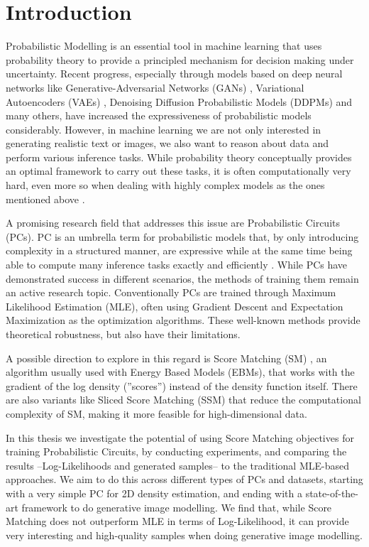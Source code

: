 \chapter{Introduction}
\label{cha:introduction}


Probabilistic Modelling is an essential tool in machine learning that uses probability theory to provide a 
principled mechanism for decision making under uncertainty. Recent progress, especially through models based on deep neural networks like Generative-Adversarial
Networks (GANs) \cite{gan}, Variational Autoencoders (VAEs) \cite{vae}, Denoising Diffusion Probabilistic Models (DDPMs) \cite{ddpm} and many others, have increased the expressiveness of probabilistic models considerably. 
However, in machine learning we are not only interested in generating realistic text or images, 
we also want to reason about data and perform various inference tasks. While probability theory conceptually provides 
an optimal framework to carry out these tasks, it is often computationally very hard, even more so when dealing 
with highly complex models as the ones mentioned above \cite{pc_intro}.

A promising research field that addresses this issue are Probabilistic Circuits (PCs). PC is an umbrella term for probabilistic models that, by only introducing 
complexity in a structured manner, are expressive while at the same time 
being able to compute many inference tasks exactly and efficiently \cite{pc_intro}. While PCs have demonstrated success in different scenarios, the methods of training them remain 
an active research topic. Conventionally PCs are trained through Maximum Likelihood Estimation (MLE), often 
using Gradient Descent and Expectation Maximization as the optimization algorithms. These well-known methods
provide theoretical robustness, but also have their limitations.

A possible direction to explore in this regard is Score Matching (SM) \cite{sm}, an algorithm usually used 
with Energy Based Models (EBMs), that works with the gradient of the log density (''scores'') instead 
of the density function itself. There are also variants like Sliced Score Matching (SSM) \cite{ssm} that reduce
the computational complexity of SM, making it more feasible for high-dimensional data. 

In this thesis we investigate the potential of using Score Matching objectives for training Probabilistic Circuits,
by conducting experiments, and comparing the results --Log-Likelihoods and generated samples-- to the traditional MLE-based approaches. 
We aim to do this across different types of PCs and datasets, starting with 
a very simple PC for 2D density estimation, and ending with a state-of-the-art framework to do generative image modelling.
We find that, while Score Matching does not outperform MLE in terms of Log-Likelihood, 
it can provide very interesting and high-quality samples when doing generative image modelling.